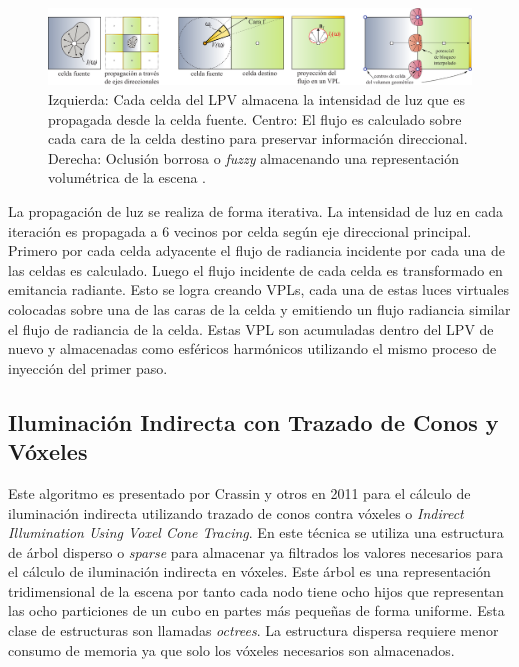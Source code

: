\begin{figure}[H]
	\centering
	\includegraphics[width=\linewidth]{media/lpv_explain.png}
	\caption{Izquierda: Cada celda del \ac{LPV} almacena la intensidad de luz que es propagada desde la celda fuente. Centro: El flujo es calculado sobre cada cara de la celda destino para preservar información direccional. Derecha: Oclusión borrosa o \emph{fuzzy} almacenando una representación volumétrica de la escena \cite{Kaplanyan:2010}.}
	\label{fig:lpv_explain}
\end{figure}

La propagación de luz se realiza de forma iterativa. La intensidad de luz en cada iteración es propagada a 6 vecinos por celda según eje direccional principal. Primero por cada celda adyacente el flujo de radiancia incidente por cada una de las celdas es calculado. Luego el flujo incidente de cada celda es transformado en emitancia radiante. Esto se logra creando \ac{VPL}s, cada una de estas luces virtuales colocadas sobre una de las caras de la celda y emitiendo un flujo radiancia similar el flujo de radiancia de la celda. Estas \ac{VPL} son acumuladas dentro del \ac{LPV} de nuevo y almacenadas como esféricos harmónicos utilizando el mismo proceso de inyección del primer paso. 

\subsection{Iluminación Indirecta con Trazado de Conos y Vóxeles}
\label{sub:voxel_cone_tracing_orig}
Este algoritmo es presentado por Crassin y otros en 2011 \cite{CNSGE11b} para el cálculo de iluminación indirecta utilizando trazado de conos contra vóxeles o \emph{Indirect Illumination Using Voxel Cone Tracing}. En este técnica se utiliza una estructura de árbol disperso o \emph{sparse} para almacenar ya filtrados los valores necesarios para el cálculo de iluminación indirecta en vóxeles. Este árbol es una representación tridimensional de la escena por tanto cada nodo tiene ocho hijos que representan las ocho particiones de un cubo en partes más pequeñas de forma uniforme. Esta clase de estructuras son llamadas \emph{octrees}. La estructura dispersa requiere menor consumo de memoria ya que solo los vóxeles necesarios son almacenados.

